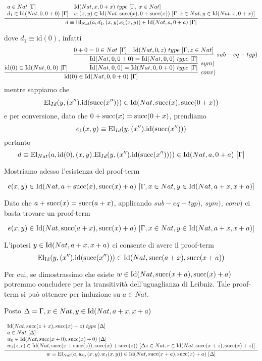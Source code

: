 \begin{scriptsize}
	\[ \infer{d \equiv \mathrm{El}_{Nat}(a, d_1, (x, y).e_1(x,y)) \in \Id{Nat}{a}{0+a}\ [\Gamma]}{\begin{array}{ll} a\in Nat\ [\Gamma] & \Id{Nat}{x}{0+x}\ type\ [\Gamma,\ x\in Nat] \\ d_1\in \Id{Nat}{0}{0+0}\ [\Gamma] & e_1(x, y)\in \Id{Nat}{\suc{x}}{0+\suc{x}}\ [\Gamma, x\in Nat, y\in \Id{Nat}{x}{0+x}]\end{array}} \]
\end{scriptsize}
dove $d_1 \equiv \mathrm{id}(0)$, infatti
\[ \infer[conv)]{\mathrm{id}(0)\in \Id{Nat}{0}{0+0}\ [\Gamma]}
{	\mathrm{id}(0)\in \Id{Nat}{0}{0}\ [\Gamma] & 
	\infer[sym)]{\Id{Nat}{0}{0} = \Id{Nat}{0}{0+0}\ type\ [\Gamma]}
	{
		\infer[sub-eq-typ)]{\Id{Nat}{0}{0+0}=\Id{Nat}{0}{0}\ type\ [\Gamma]}
		{0+0 = 0\in Nat\ [\Gamma] & \Id{Nat}{0}{z}\ type\ [\Gamma, z\in Nat]}
	}
}
\]
mentre sappiamo che
\[ \mathrm{El}_{Id}(y, (x'').\mathrm{id}(\mathrm{succ}(x''))) \in \mathrm{Id}(Nat, \mathrm{succ}(x), \mathrm{succ}(0+x))\]
e per conversione, dato che $0+\mathrm{succ}(x) = \mathrm{succ}(0+x)$, prendiamo
\[ e_1(x, y) \equiv \mathrm{El}_{Id}(y, (x'').\mathrm{id}(\mathrm{succ}(x''))) \]
pertanto
\[d \equiv \mathrm{El}_{Nat}(a, \mathrm{id}(0), (x, y).\mathrm{El}_{Id}(y, (x'').\mathrm{id}(\mathrm{succ}(x'')))) \in \mathrm{Id}(Nat, a, 0+a)\ [\Gamma]\]

Mostriamo adesso l'esistenza del proof-term 

\[e(x, y)\in \mathrm{Id}(Nat, a+\mathrm{succ}(x), \mathrm{succ}(x)+a)\ [\Gamma, x\in Nat, y\in \mathrm{Id}(Nat, a+x, x+a)]\]

Dato che $a+\mathrm{succ}(x) = \mathrm{succ}(a+x)$, applicando $sub-eq-typ),\ sym),\ conv)$ ci basta trovare un proof-term

\[e(x, y)\in \mathrm{Id}(Nat, \mathrm{succ}(a+x), \mathrm{succ}(x)+a)\ [\Gamma, x\in Nat, y\in \mathrm{Id}(Nat, a+x, x+a)]\]

L'ipotesi $y \in \mathrm{Id}(Nat, a+x, x+a)$ ci consente di avere il proof-term
\[ \mathrm{El}_{\mathrm{Id}}(y, (x'').\mathrm{id}(\mathrm{succ}(x''))) \in \mathrm{Id}(Nat, \mathrm{succ}(a+x), \mathrm{succ}(x+a))\]

Per cui, se dimostrassimo che esiste $w \in \mathrm{Id}(Nat, \mathrm{succ}(x+a), \mathrm{succ}(x)+a)$ potremmo concludere per la transitività dell'uguaglianza di Leibniz. Tale proof-term si può ottenere per induzione su $a\in Nat$.

Posto $\Delta = \Gamma, x\in Nat, y\in \mathrm{Id}(Nat, a+x, x+a)$

\begin{scriptsize}
	\[ \infer{w \equiv \mathrm{El}_{Nat}(a, w_0, (x, y).w_1(x,y)) \in \Id{Nat}{\suc{x+a}}{\suc{x}+a}\ [\Delta]}{\begin{array}{l}
		\Id{Nat}{\suc{z+x}}{\suc{x}+z}\ type\ [\Delta] \\ a\in Nat\ [\Delta] \\  w_0\in \Id{Nat}{\suc{x+0}}{\suc{x}+0}\ [\Delta] \\ w_1(z, r)\in \Id{Nat}{\suc{x+\suc{z}}}{\suc{x}+\suc{z}}\ [\Delta z\in Nat, r\in \Id{Nat}{\suc{x+z}}{\suc{x}+z}]\end{array}} \]
\end{scriptsize}

